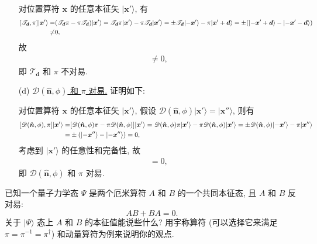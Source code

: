 \documentclass{assignment}
\begin{document}
\begin{sol}
\begin{itemize}
        对位置算符 $\bm{x}$ 的任意本征矢 $\lvert\bm{x}'\rangle$, 有
        \begin{align}
            \notag[\mathscr{T}_{\bm{d}},\pi]\lvert\bm{x}'\rangle=&(\mathscr{T}_{\bm{d}}\pi-\pi\mathscr{T}_{\bm{d}})\lvert\bm{x}'\rangle=\mathscr{T}_{\bm{d}}\pi\lvert\bm{x}'\rangle-\pi\mathscr{T}_{\bm{d}}\lvert\bm{x}'\rangle=\pm\mathscr{T}_{\bm{d}}\lvert-\bm{x}'\rangle-\pi\lvert\bm{x}'+\bm{d}\rangle=\pm(\lvert-\bm{x}'+\bm{d}\rangle-\lvert-\bm{x}'-\bm{d}\rangle)\\
            \neq&0,
        \end{align}
        故
        \begin{align}
            [\mathscr{T}_{\bm{d}},\pi]\neq 0,
        \end{align}
        即 $\mathscr{T}_{\bm{d}}$ 和 $\pi$ 不对易.
        \item[(d)] \uline{$\mathscr{D}(\hat{\bm{n}},\phi)$ 和 $\pi$ 对易.} 证明如下:

        对位置算符 $\bm{x}$ 的任意本征矢 $\lvert\bm{x}'\rangle$, 假设 $\mathscr{D}(\hat{\bm{n}},\phi)\lvert\bm{x}'\rangle=\lvert\bm{x}''\rangle$, 则有
        \begin{align}
            \notag[\mathscr{D}(\hat{\bm{n}},\phi),\pi]\lvert\bm{x}'\rangle=&[\mathscr{D}(\hat{\bm{n}},\phi)\pi-\pi\mathscr{D}(\hat{\bm{n}},\phi)]\lvert\bm{x}'\rangle=\mathscr{D}(\hat{\bm{n}},\phi)\pi\lvert\bm{x}'\rangle-\pi\mathscr{D}(\hat{\bm{n}},\phi)\lvert\bm{x}'\rangle=\pm\mathscr{D}(\hat{\bm{n}},\phi)\lvert-\bm{x}'\rangle-\pi\lvert\bm{x}''\rangle\\
            =&\pm(\lvert-\bm{x}''\rangle-\lvert-\bm{x}''\rangle)=0,
        \end{align}
        考虑到 $\lvert\bm{x}'\rangle$ 的任意性和完备性, 故
        \begin{align}
            [\mathscr{D}(\hat{\bm{n}},\phi),\pi]=0,
        \end{align}
        即 $\mathscr{D}(\hat{\bm{n}},\phi)$ 和 $\pi$ 对易.
    \end{itemize}
\end{sol}

\begin{prob}[课本习题 4.3]
    已知一个量子力学态 $\Psi$ 是两个厄米算符 $A$ 和 $B$ 的一个共同本征态, 且 $A$ 和 $B$ 反对易:
    \[
        AB+BA=0.
    \]
    关于 $\lvert\Psi\rangle$ 态上 $A$ 和 $B$ 的本征值能说些什么? 用宇称算符 (可以选择它来满足 $\pi=\pi^{-1}=\pi^{\dagger}$) 和动量算符为例来说明你的观点.
\end{prob}
\begin{sol}
    
\end{sol}
\end{document}
